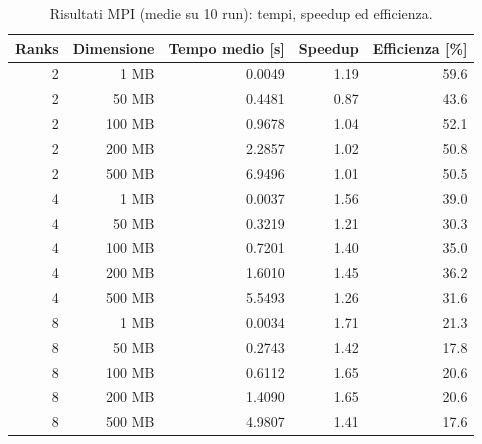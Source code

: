 			\begin{table}[H]
				\centering
				\begin{tabular}{|r|r|r|r|r|}
					\hline
					\textbf{Ranks} & \textbf{Dimensione} & \textbf{Tempo medio [s]} & \textbf{Speedup} & \textbf{Efficienza [\%]} \\
					\hline
					2                   & 1 MB                & 0.0049                   & 1.19             & 59.6                     \\
					2                   & 50 MB               & 0.4481                   & 0.87             & 43.6                     \\
					2                   & 100 MB              & 0.9678                   & 1.04             & 52.1                     \\
					2                   & 200 MB              & 2.2857                   & 1.02             & 50.8                     \\
					2                   & 500 MB              & 6.9496                   & 1.01             & 50.5                     \\
					\hline
					4                   & 1 MB                & 0.0037                   & 1.56             & 39.0                     \\
					4                   & 50 MB               & 0.3219                   & 1.21             & 30.3                     \\
					4                   & 100 MB              & 0.7201                   & 1.40             & 35.0                     \\
					4                   & 200 MB              & 1.6010                   & 1.45             & 36.2                     \\
					4                   & 500 MB              & 5.5493                   & 1.26             & 31.6                     \\
					\hline
					8                   & 1 MB                & 0.0034                   & 1.71             & 21.3                     \\
					8                   & 50 MB               & 0.2743                   & 1.42             & 17.8                     \\
					8                   & 100 MB              & 0.6112                   & 1.65             & 20.6                     \\
					8                   & 200 MB              & 1.4090                   & 1.65             & 20.6                     \\
					8                   & 500 MB              & 4.9807                   & 1.41             & 17.6                     \\
					\hline
				\end{tabular}
				\caption{Risultati MPI (medie su 10 run): tempi, speedup ed efficienza.}
				\label{tab:mpi-summary}
			\end{table}
			
